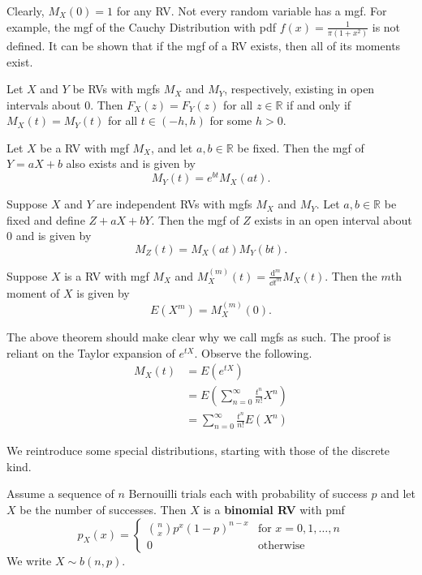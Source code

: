 Clearly, $M_X(0)=1$ for any RV. Not every random variable has a mgf. For example, the mgf of the Cauchy Distribution with pdf $f(x)=\frac{1}{\pi(1+x^2)}$ is not defined. It can be shown that if the mgf of a RV exists, then all of its moments exist.

\begin{theorem}[]
	Let $X$ and $Y$ be RVs with mgfs $M_X$ and $M_Y$, respectively, existing in open intervals about 0. Then $F_X(z)=F_Y(z)$ for all $z\in\mathbb R$ if and only if $M_X(t)=M_Y(t)$ for all $t\in(-h,h)$ for some $h>0$.
\end{theorem}

\begin{theorem}[]
	Let $X$ be a RV with mgf $M_X$, and let $a,b\in\mathbb R$ be fixed. Then the mgf of $Y=aX+b$ also exists and is given by $$M_Y(t)=e^{bt}M_X(at).$$
\end{theorem}

\begin{theorem}[]
	Suppose $X$ and $Y$ are independent RVs with mgfs $M_X$ and $M_Y$. Let $a,b\in\mathbb R$ be fixed and define $Z+aX+bY$. Then the mgf of $Z$ exists in an open interval about 0 and is given by
	$$M_Z(t)=M_X(at)M_Y(bt).$$
\end{theorem}

\begin{theorem}[]
	Suppose $X$ is a RV with mgf $M_X$ and $M_X^{(m)}(t)=\frac{\mathrm{d}^m}{\dd t^m}M_X(t)$. Then the $m$th moment of $X$ is given by $$E(X^m)=M_X^{(m)}(0).$$
\end{theorem}

The above theorem should make clear why we call mgfs as such. The proof is reliant on the Taylor expansion of $e^{tX}$. Observe the following.
\begin{align*}
	M_X(t)&=E(e^{tX})\\
	&=E\left(\sum_{n=0}^\infty \frac{t^n}{n!}X^n\right)\\
	&=\sum_{n=0}^\infty \frac{t^n}{n!}E(X^n)
\end{align*}

We reintroduce some special distributions, starting with those of the discrete kind.

\begin{definition}[binomial RV]
	Assume a sequence of $n$ Bernouilli trials each with probability of success $p$ and let $X$ be the number of successes. Then $X$ is a \textbf{binomial RV} with pmf $$p_X(x)=\begin{cases}
		\binom{n}{x}p^x(1-p)^{n-x} & \text{for $x=0,1,\hdots,n$}\\
		0 & \text{otherwise}
	\end{cases}$$
	We write $X\sim b(n,p)$.
\end{definition}

